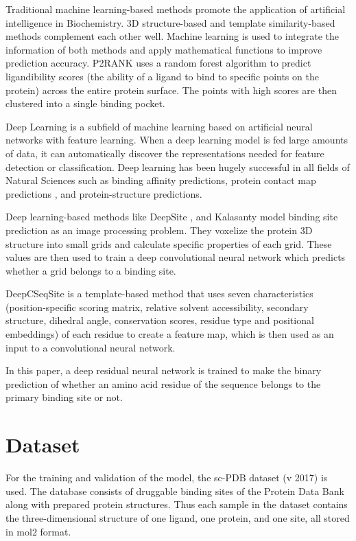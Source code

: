 \documentclass[journal=jacsat,manuscript=article]{achemso}
\begin{document}
Traditional machine learning-based methods promote the application of artificial intelligence in Biochemistry. 3D structure-based and template similarity-based methods complement each other well. Machine learning is used to integrate the information of both methods and apply mathematical functions to improve prediction accuracy. P2RANK \cite{krivak2018p2rank} uses a random forest algorithm to predict ligandibility scores (the ability of a ligand to bind to specific points on the protein) across the entire protein surface. The points with high scores are then clustered into a single binding pocket.

Deep Learning is a subfield of machine learning based on artificial neural networks with feature learning. When a deep learning model is fed large amounts of data, it can automatically discover the representations needed for feature detection or classification. Deep learning has been hugely successful in all fields of Natural Sciences such as binding affinity predictions\cite{jimenez2018k,ozturk2018deepdta}, protein contact map predictions \cite{hanson2018accurate,wang2017accurate}, and protein-structure predictions\cite{senior2020improved,li2019ensembling}.

Deep learning-based methods like DeepSite \cite{jimenez2017deepsite}, and Kalasanty \cite{stepniewska2020improving} model binding site prediction as an image processing problem. They voxelize the protein 3D structure into small grids and calculate specific properties of each grid. These values are then used to train a deep convolutional neural network which predicts whether a grid belongs to a binding site.

DeepCSeqSite \cite{cui2019predicting} is a template-based method that uses seven characteristics (position-specific scoring matrix, relative solvent accessibility, secondary structure, dihedral angle, conservation scores, residue type and positional embeddings) of each residue to create a feature map, which is then used as an input to a convolutional neural network.

In this paper, a deep residual neural network is trained to make the binary prediction of whether an amino acid residue of the sequence belongs to the primary binding site or not.

\section{Dataset}
\quad For the training and validation of the model, the sc-PDB\cite{desaphy2015sc} dataset (v 2017) is used. The database consists of druggable binding sites of the Protein Data Bank along with prepared protein structures. Thus each sample in the dataset contains the three-dimensional structure of one ligand, one protein, and one site, all stored in mol2 format.
\end{document}
